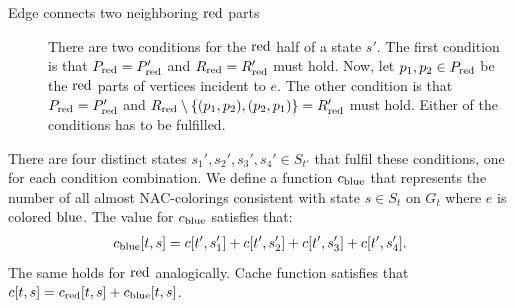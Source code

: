 \begin{lemma}
\begin{description}
		\item[Edge connects two neighboring \( \text{red} \) parts]
		      There are two conditions for the \( \text{red} \) half of a state \( s' \).
		      The first condition is that \( P_{\text{red}} = P_{\text{red}}' \)
		      and \( R_{\text{red}} = R_{\text{red}}' \) must hold.
		      Now, let \( p_1, p_2 \in P_{\text{red}} \) be the \( \text{red} \) parts
		      of vertices incident to \( e \).
		      The other condition is that \( P_{\text{red}} = P_{\text{red}}' \) and
		      \( R_{\text{red}} \setminus \{(p_{1}, p_{2}), (p_{2}, p_{1})\} = R_{\text{red}}' \) must hold.
		      Either of the conditions has to be fulfilled.

	\end{description}
	There are four distinct states \( s_1', s_2', s_3', s_4' \in S_{t'} \)
	that fulfil these conditions, one for each condition combination.
	We define a function \( c_{\text{blue}} \) that represents
	the number of all almost NAC-colorings
	consistent with state \( s \in S_t \) on \( G_t \)
	where \( e \) is colored \( \text{blue} \).
	The value for \( c_{\text{blue}} \) satisfies that:
	\begin{align*}
		c_{\text{blue}}[t, s] & = c[t', s_1'] + c[t', s_2'] + c[t', s_3'] + c[t', s_4']. \\
	\end{align*}
	The same holds for \( \text{red} \) analogically.
	Cache function satisfies that  \( c[t, s] = c_{\text{red}}[t, s] + c_{\text{blue}}[t, s] \).
\end{lemma}
